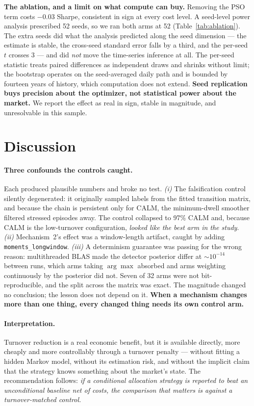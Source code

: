 \documentclass[sigconf,anonymous,review]{acmart}
\newcommand{\ICAIFcut}{}
\begin{document}
\textbf{The ablation, and a limit on what compute can buy.} Removing the PSO term
costs $-0.03$ Sharpe, consistent in sign at every cost level. A seed-level power
analysis prescribed 52 seeds, so we ran both arms at 52
(Table~\ref{tab:ablation}). The extra seeds did what the analysis predicted along
the seed dimension --- the estimate is stable, the cross-seed standard error falls
by a third, and the per-seed $t$ crosses 3 --- and did \emph{not} move the
time-series inference at all. The per-seed statistic treats paired differences as
independent draws and shrinks without limit; the bootstrap operates on the
seed-averaged daily path and is bounded by fourteen years of history, which
computation does not extend. \textbf{Seed replication buys precision about the
optimizer, not statistical power about the market.} We report the effect as real in
sign, stable in magnitude, and unresolvable in this sample.

\section{Discussion}

\ICAIFcut
\paragraph{Three confounds the controls caught.} Each produced plausible numbers
and broke no test. \emph{(i)} The falsification control silently degenerated: it
originally sampled labels from the fitted transition matrix, and because the chain
is persistent only for CALM, the minimum-dwell smoother filtered stressed episodes
away. The control collapsed to 97\% CALM and, because CALM is the low-turnover
configuration, \emph{looked like the best arm in the study}. \emph{(ii)}
Mechanism~2's effect was a window-length artifact, caught by adding
\texttt{moments\_longwindow}. \emph{(iii)} A determinism guarantee was passing for
the wrong reason: multithreaded BLAS made the detector posterior differ at
$\sim\!10^{-14}$ between runs, which arms taking $\arg\max$ absorbed and arms
weighting continuously by the posterior did not. Seven of 32 arms were not
bit-reproducible, and the split across the matrix was exact. The magnitude changed
no conclusion; the lesson does not depend on it. \textbf{When a mechanism changes
more than one thing, every changed thing needs its own control arm.}

\paragraph{Interpretation.} Turnover reduction is a real economic benefit, but it
is available directly, more cheaply and more controllably through a turnover
penalty --- without fitting a hidden Markov model, without its estimation risk, and
without the implicit claim that the strategy knows something about the market's
state. The recommendation follows: \emph{if a conditional allocation strategy is
reported to beat an unconditional baseline net of costs, the comparison that
matters is against a turnover-matched control.}
\end{document}
